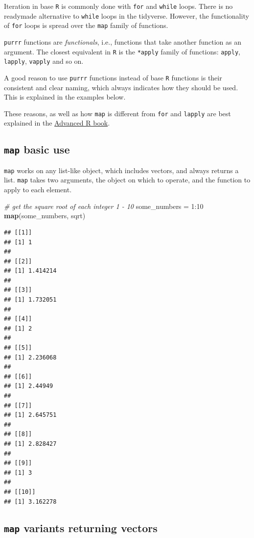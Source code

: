 \documentclass[]{book}
\newenvironment{Shaded}{}{}
\newcommand{\CommentTok}[1]{\textcolor[rgb]{0.38,0.63,0.69}{\textit{#1}}}
\newcommand{\DecValTok}[1]{\textcolor[rgb]{0.25,0.63,0.44}{#1}}
\newcommand{\KeywordTok}[1]{\textcolor[rgb]{0.00,0.44,0.13}{\textbf{#1}}}
\newcommand{\NormalTok}[1]{#1}
\newcommand{\OperatorTok}[1]{\textcolor[rgb]{0.40,0.40,0.40}{#1}}
\newcommand{\StringTok}[1]{\textcolor[rgb]{0.25,0.44,0.63}{#1}}
\begin{document}
Iteration in base \texttt{R} is commonly done with \texttt{for} and \texttt{while} loops.
There is no readymade alternative to \texttt{while} loops in the tidyverse.
However, the functionality of \texttt{for} loops is spread over the \texttt{map} family of functions.

\texttt{purrr} functions are \emph{functionals}, i.e., functions that take another function as an argument.
The closest equivalent in \texttt{R} is the \texttt{*apply} family of functions: \texttt{apply}, \texttt{lapply}, \texttt{vapply} and so on.

A good reason to use \texttt{purrr} functions instead of base \texttt{R} functions is their consistent and clear naming, which always indicates how they should be used.
This is explained in the examples below.

These reasons, as well as how \texttt{map} is different from \texttt{for} and \texttt{lapply} are best explained in the \href{https://adv-r.hadley.nz/functionals.html}{Advanced R book}.

\hypertarget{map-basic-use}{%
\subsection{\texorpdfstring{\texttt{map} basic use}{map basic use}}\label{map-basic-use}}

\texttt{map} works on any list-like object, which includes vectors, and always returns a list. \texttt{map} takes two arguments, the object on which to operate, and the function to apply to each element.

\begin{Shaded}
\begin{Highlighting}[]
\CommentTok{# get the square root of each integer 1 - 10}
\NormalTok{some_numbers =}\StringTok{ }\DecValTok{1}\OperatorTok{:}\DecValTok{10}
\KeywordTok{map}\NormalTok{(some_numbers, sqrt)}
\end{Highlighting}
\end{Shaded}

\begin{verbatim}
## [[1]]
## [1] 1
## 
## [[2]]
## [1] 1.414214
## 
## [[3]]
## [1] 1.732051
## 
## [[4]]
## [1] 2
## 
## [[5]]
## [1] 2.236068
## 
## [[6]]
## [1] 2.44949
## 
## [[7]]
## [1] 2.645751
## 
## [[8]]
## [1] 2.828427
## 
## [[9]]
## [1] 3
## 
## [[10]]
## [1] 3.162278
\end{verbatim}

\hypertarget{map-variants-returning-vectors}{%
\subsection{\texorpdfstring{\texttt{map} variants returning vectors}{map variants returning vectors}}\label{map-variants-returning-vectors}}
\end{document}
